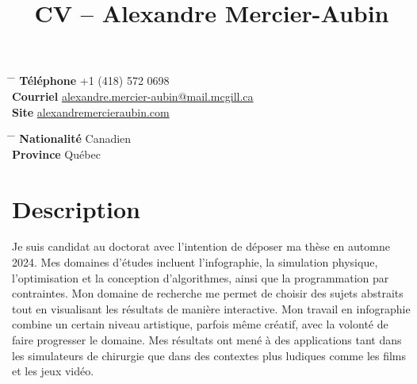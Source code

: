 \documentclass[10pt]{article} %
\begin{document}

\title{CV -- Alexandre Mercier-Aubin} %


\parbox{0.5\textwidth}{ %
\begin{tabbing} %
\hspace{3cm} \= \hspace{4cm} \= \kill %
{\bf Téléphone} \> +1 (418) 572 0698 \\ %
{\bf Courriel} \> \href{mailto:alexandre.mercier-aubin@mail.mcgill.ca}{alexandre.mercier-aubin@mail.mcgill.ca} \\ %
{\bf Site} \> \href{https://alexandremercieraubin.com}{alexandremercieraubin.com} \\
\end{tabbing}}
\hfill %
\parbox{0.5\textwidth}{ %
\begin{tabbing} %
\hspace{3cm} \= \hspace{4cm} \= \kill %
{\bf Nationalité} \> Canadien \\ %
{\bf Province} \> {Québec}\\
\end{tabbing}}

\vspace{-0.7cm} 

\justifying

\section{Description}

Je suis candidat au doctorat avec l'intention de déposer ma thèse en automne 2024. Mes domaines d'études incluent l'infographie, la simulation physique, l'optimisation et la conception d'algorithmes, ainsi que la programmation par contraintes. Mon domaine de recherche me permet de choisir des sujets abstraits tout en visualisant les résultats de manière interactive. Mon travail en infographie combine un certain niveau artistique, parfois même créatif, avec la volonté de faire progresser le domaine. Mes résultats ont mené à des applications tant dans les simulateurs de chirurgie que dans des contextes plus ludiques comme les films et les jeux vidéo.
\end{document}
